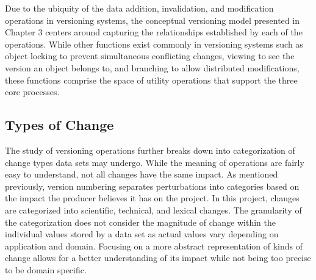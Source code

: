 Due to the ubiquity of the data addition, invalidation, and modification operations in versioning systems, the conceptual versioning model presented in Chapter 3 centers around capturing the relationships established by each of the operations.
While other functions exist commonly in versioning systems such as object locking to prevent simultaneous conflicting changes, viewing to see the version an object belongs to, and branching to allow distributed modifications, these functions comprise the space of utility operations that support the three core processes.

\subsection{Types of Change}

The study of versioning operations further breaks down into categorization of change types data sets may undergo.
While the meaning of operations are fairly easy to understand, not all changes have the same impact.
As mentioned previously, version numbering separates perturbations into categories based on the impact the producer believes it has on the project.
In this project, changes are categorized into scientific, technical, and lexical changes.
The granularity of the categorization does not consider the magnitude of change within the individual values stored by a data set as actual values vary depending on application and domain.
Focusing on a more abstract representation of kinds of change allows for a better understanding of its impact while not being too precise to be domain specific.


